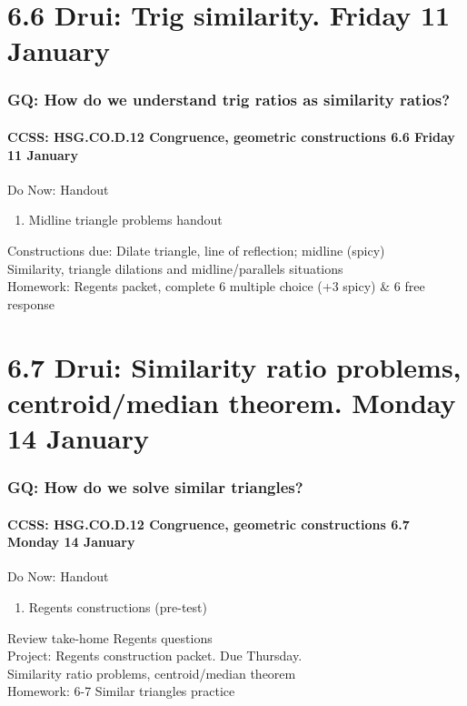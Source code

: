 \documentclass{beamer}
\begin{document}
\section{6.6 Drui: Trig similarity. Friday 11 January}
  \frame
  {
    \frametitle{GQ: How do we understand trig ratios as similarity ratios?}
    \framesubtitle{CCSS: HSG.CO.D.12 Congruence, geometric constructions  \alert{6.6 Friday 11 January}}

    \begin{block}{Do Now: Handout}
      \begin{enumerate}
        \item Midline triangle problems handout
      \end{enumerate}
    \end{block}
    Constructions due: Dilate triangle, line of reflection; midline (spicy) \\[0.5cm]
    Similarity, triangle dilations and midline/parallels situations\\[0.5cm]
    Homework: Regents packet, complete 6 multiple choice (+3 spicy) \& 6 free response
  }

\section{6.7 Drui: Similarity ratio problems, centroid/median theorem. Monday 14 January}
  \frame
  {
    \frametitle{GQ: How do we solve similar triangles?}
    \framesubtitle{CCSS: HSG.CO.D.12 Congruence, geometric constructions  \alert{6.7 Monday 14 January}}

    \begin{block}{Do Now: Handout}
      \begin{enumerate}
        \item Regents constructions (pre-test)
      \end{enumerate}
    \end{block}
    Review take-home Regents questions\\
    Project: Regents construction packet. Due Thursday.\\
    Similarity ratio problems, centroid/median theorem\\[0.5cm]
    Homework: 6-7 Similar triangles practice
  }
\end{document}
